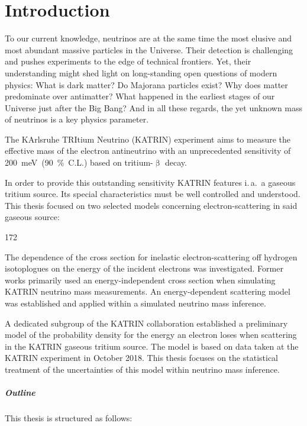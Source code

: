 \chapter{Introduction}
To our current knowledge, neutrinos are at the same time the most elusive and most abundant massive particles in the Universe. Their detection is challenging and pushes experiments to the edge of technical frontiers. Yet, their understanding might shed light on long-standing open questions of modern physics: What is dark matter? Do Majorana particles exist? Why does matter predominate over antimatter? What happened in the earliest stages of our Universe just after the Big Bang? And in all these regards, the yet unknown mass of neutrinos is a key physics parameter.

The KArlsruhe TRItium Neutrino (KATRIN) experiment aims to measure the effective mass of the electron antineutrino with an unprecedented sensitivity of \mbox{\SI{200}{meV} (\SI{90}{\percent} C.L.)} based on tritium-$\upbeta$ decay. 

In order to provide this outstanding sensitivity KATRIN features i.\,a.~a gaseous tritium source. Its special characteristics must be well controlled and understood. This thesis focused on two selected models concerning electron-scattering in said gaseous source: 
\begin{dingautolist}{172}
	\item\label{itm:introductionEDepCrossSec} The dependence of the cross section for inelastic electron-scattering off hydrogen isotoplogues on the energy of the incident electrons was investigated. Former works primarily used an energy-independent cross section when simulating KATRIN neutrino mass measurements. An energy-dependent scattering model was established and applied within a simulated neutrino mass inference.
	\item\label{itm:introductionKatrinEloss} A dedicated subgroup of the KATRIN collaboration established a preliminary model of the probability density for the energy an electron loses when scattering in the KATRIN gaseous tritium source. The model is based on data taken at the KATRIN experiment in October 2018. This thesis focuses on the statistical treatment of the uncertainties of this model within neutrino mass inference.
\end{dingautolist}

\paragraph{Outline}
This thesis is structured as follows:

